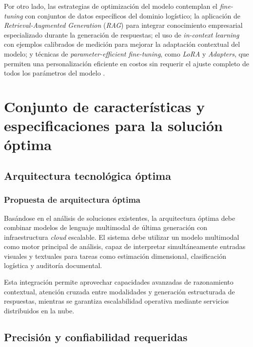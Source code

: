 Por otro lado, las estrategias de optimización del modelo contemplan el \textit{fine-tuning} con conjuntos de datos específicos del dominio logístico; la aplicación de \textit{Retrieval-Augmented Generation} (\textit{RAG}) para integrar conocimiento empresarial especializado durante la generación de respuestas; el uso de \textit{in-context learning} con ejemplos calibrados de medición para mejorar la adaptación contextual del modelo; y técnicas de \textit{parameter-efficient fine-tuning}, como \textit{LoRA} y \textit{Adapters}, que permiten una personalización eficiente en costos sin requerir el ajuste completo de todos los parámetros del modelo \cite{ArticleRef255139}.

\section{Conjunto de características y especificaciones para la solución óptima}

\subsection{Arquitectura tecnológica óptima}

\subsubsection{Propuesta de arquitectura óptima}

Basándose en el análisis de soluciones existentes, la arquitectura óptima debe combinar modelos de lenguaje multimodal de última generación con infraestructura \textit{cloud} escalable. El sistema debe utilizar un modelo multimodal como motor principal de análisis, capaz de interpretar simultáneamente entradas visuales y textuales para tareas como estimación dimensional, clasificación logística y auditoría documental.

Esta integración permite aprovechar capacidades avanzadas de razonamiento contextual, atención cruzada entre modalidades y generación estructurada de respuestas, mientras se garantiza escalabilidad operativa mediante servicios distribuidos en la nube.

\subsection{Precisión y confiabilidad requeridas}

